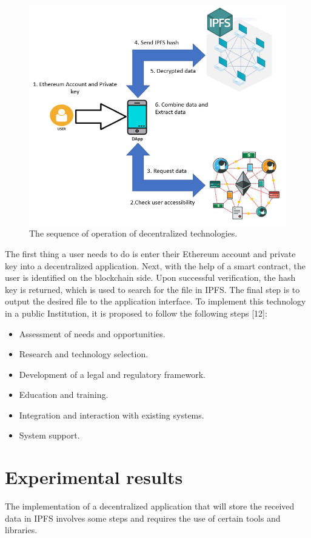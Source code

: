 \documentclass[10pt,conference,a4paper]{IEEEtran_EDM}
\begin{document}
\begin{figure}
\centerline{\includegraphics[scale=0.67]{fig2.png}}
\caption{The sequence of operation of decentralized technologies.}
\label{Sequence}
\end{figure}

The first thing a user needs to do is enter their Ethereum account and private key into a decentralized application. Next, with the help of a smart contract, the user is identified on the blockchain side. Upon successful verification, the hash key is returned, which is used to search for the file in IPFS. The final step is to output the desired file to the application interface. 
To implement this technology in a public Institution, it is proposed to follow the following steps [12]:
\begin{itemize}
    \item Assessment of needs and opportunities.
    \item Research and technology selection.
    \item Development of a legal and regulatory framework.
    \item Education and training.
    \item Integration and interaction with existing systems.
    \item System support.
\end{itemize}


\section{Experimental results}
The implementation of a decentralized application that will store the received data in IPFS involves some steps and requires the use of certain tools and libraries. 
\end{document}
